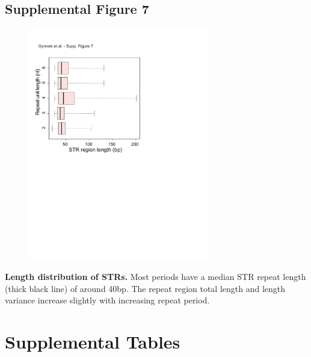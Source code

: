 \subsection{Supplemental Figure 7}
\begin{figure}[h!]
\centering
\label{fig:lobsup7}
\includegraphics[width=0.7\textwidth]{Figures/Chapter2/SuppFig7.pdf}
\end{figure}
\textbf{Length distribution of STRs.} Most periods have a median STR repeat length (thick black line) of around 40bp. The repeat region total length and length variance increase slightly with increasing repeat period.
\section{Supplemental Tables}
